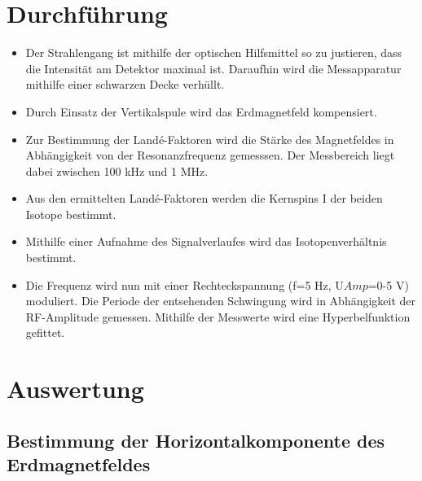 \documentclass[]{scrartcl}
\begin{document}
\section{Durchführung}
\begin{itemize}
	\item Der Strahlengang ist mithilfe der optischen Hilfsmittel so zu justieren, dass die Intensität am Detektor maximal ist. Daraufhin wird die Messapparatur mithilfe einer schwarzen Decke verhüllt. 
	\item Durch Einsatz der Vertikalspule wird das Erdmagnetfeld kompensiert. 
	\item Zur Bestimmung der Landé-Faktoren wird die Stärke des Magnetfeldes in Abhängigkeit von der Resonanzfrequenz gemesssen. Der Messbereich liegt dabei zwischen 100 kHz und 1 MHz.
	\item Aus den ermittelten Landé-Faktoren werden die Kernspins I der beiden Isotope bestimmt. 
	\item Mithilfe einer Aufnahme des Signalverlaufes wird das Isotopenverhältnis bestimmt.
	\item Die Frequenz wird nun mit einer Rechteckspannung (f=5 Hz, U${Amp}$=0-5 V) moduliert. Die Periode der entsehenden Schwingung wird in Abhängigkeit der RF-Amplitude gemessen. Mithilfe der Messwerte wird eine Hyperbelfunktion gefittet.
\end{itemize}

\section{Auswertung}

\subsection{Bestimmung der Horizontalkomponente des Erdmagnetfeldes}
\end{document}

